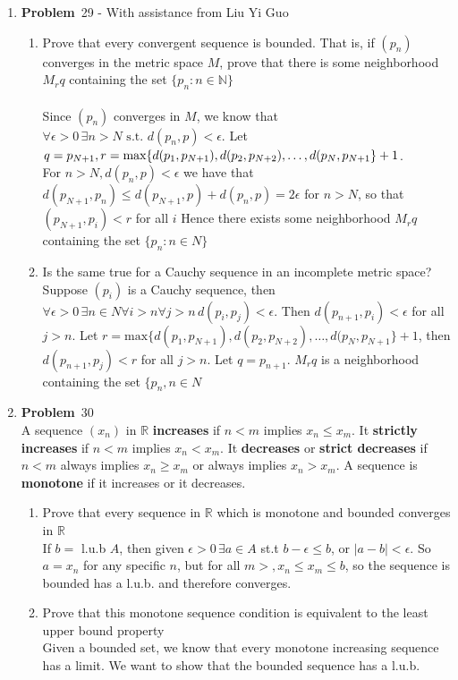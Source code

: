 \documentclass[12pt]{amsart}
\newcommand{\benu}{\begin{enumerate}}
\newcommand{\eenu}{\end{enumerate}}
\theoremstyle{definition}
\newcommand{\mbR}{\mathbb{R}}
\newcommand{\mbN}{\mathbb{N}}
\newcommand{\itep}{\item {\bfseries Problem}\ }
\begin{document}
\begin{enumerate}[series=p]
\itep 29 - With assistance from Liu Yi Guo\\
\benu
\item Prove that every convergent sequence is bounded.  That is, if $(p_n)$ converges in the metric space $M$, prove that there is some neighborhood $M_rq$ containing the set $\{p_n:n\in \mbN\}$\\
\\
Since $(p_n)$ converges in $M$, we know that
$\forall \epsilon > 0 \, \exists n>N \text{ s.t. } d(p_n,p) < \epsilon$.  Let $q = p_{N+1}, \\
r = \text{max} \{d(p_1, p_{N+1}), d(p_2, p_{N+2}), \dots,d(p_N, p_{N+1}\} +1$.
\\
For $n > N, d(p_n, p) < \epsilon$ we have that
$d(p_{N+1}, p_n) \leq d(p_{N+1}, p) + d(p_n, p) = 2\epsilon$ for $n > N$, so that $(p_{N+1}, p_i) < r$ for all $i$
Hence there exists some neighborhood $M_rq$ containing the set $\{p_n: n \in N\}$\\

\item Is the same true for a Cauchy sequence in an incomplete metric space?
\\
Suppose $(p_i)$ is a Cauchy sequence, then
$\forall \epsilon > 0 \, \exists n \in N \forall i > n \forall j > n \, d(p_i, p_j) < \epsilon$.
Then $d(p_{n+1}, p_i) < \epsilon$ for all $j > n$.  Let $r = \text{max} \{d(p_1, p_{N+1}), d(p_2, p_{N+2}), \dots, d(p_N, p_{N+1}\} +1$, then $d(p_{n+1}, p_j) < r$ for all $j > n$.  Let $q = p_{n+1}$.  $M_rq$ is a neighborhood containing the set $\{p_n, n \in N$
\eenu
\newpage


\itep 30\\
A sequence $(x_n)$ in $\mbR$ \textbf{increases} if $n< m$ implies $x_n \leq x_m$.  It \textbf{strictly increases} if $n < m$ implies $x_n < x_m$.  It \textbf{decreases} or \textbf{strict decreases} if $n < m$ always implies $x_n \geq x_m$ or always implies $x_n > x_m$.  A sequence is \textbf{monotone} if it increases or it decreases.
\benu
\item Prove that every sequence in $\mbR$ which is monotone and bounded converges in $\mbR$
\\
If $b = $ l.u.b $A$, then given $\epsilon > 0 \, \exists a \in A$ st.t $b - \epsilon \leq b$, or $|a -b | < \epsilon$.  So $a = x_n$ for any specific $n$, but for all $m > , x_n \leq x_m \leq b$, so the sequence is bounded has a l.u.b. and therefore converges.
\item Prove that this monotone sequence condition is equivalent to the least upper bound property
\\
Given a bounded set, we know that every monotone increasing sequence has a limit.  We want to show that the bounded sequence has a l.u.b.
\eenu


\end{enumerate}
\end{document}

